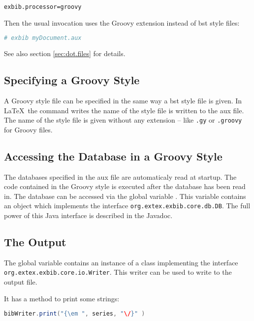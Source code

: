 \begin{lstlisting}
exbib.processor=groovy
\end{lstlisting}

Then the usual invocation uses the Groovy extension instead of bst
style files:

\begin{lstlisting}[language=sh]
# exbib myDocument.aux
\end{lstlisting}

See also section \ref{sec:dot.files} for details.


\subsection{Specifying a Groovy Style}

A Groovy style file can be specified in the same way a bst style file
is given. In \LaTeX\ the command  writes the
name of the style file is written to the aux file. The name of the
style file is given without any extension -- like \verb|.gy| or
\verb|.groovy| for Groovy files.


\subsection{Accessing the Database in a Groovy Style}

The databases specified in the aux file are automaticaly read at
startup. The code contained in the Groovy style is executed after the
database has been read in. The database can be accessed via the global
variable . This variable contains an object which
implements the interface \texttt{org.extex.exbib.core.db.DB}. The full
power of this Java interface is described in the Javadoc.


\subsection{The Output}

The global variable  contains an instance of a class
implementing the interface \texttt{org.extex.exbib.core.io.Writer}.
This writer can be used to write to the output file.

It has a method  to print some strings:

\begin{lstlisting}[language=Java]
  bibWriter.print("{\em ", series, "\/}" )
\end{lstlisting}

